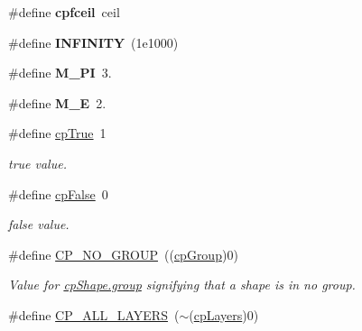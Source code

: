 \begin{DoxyCompactItemize}
\item 
\hypertarget{group__basic_types_gaccf0915062d413aede408e4ef872b61d}{\#define {\bfseries cpfceil}~ceil}\label{group__basic_types_gaccf0915062d413aede408e4ef872b61d}

\item 
\hypertarget{group__basic_types_ga956e2723d559858d08644ac99146e910}{\#define {\bfseries I\-N\-F\-I\-N\-I\-T\-Y}~(1e1000)}\label{group__basic_types_ga956e2723d559858d08644ac99146e910}

\item 
\hypertarget{group__basic_types_gae71449b1cc6e6250b91f539153a7a0d3}{\#define {\bfseries M\-\_\-\-P\-I}~3.}\label{group__basic_types_gae71449b1cc6e6250b91f539153a7a0d3}

\item 
\hypertarget{group__basic_types_ga9bf5d952c5c93c70f9e66c9794d406c9}{\#define {\bfseries M\-\_\-\-E}~2.}\label{group__basic_types_ga9bf5d952c5c93c70f9e66c9794d406c9}

\item 
\hypertarget{group__basic_types_gae30fc24a6e711797b9d39efa0e999987}{\#define \hyperlink{group__basic_types_gae30fc24a6e711797b9d39efa0e999987}{cp\-True}~1}\label{group__basic_types_gae30fc24a6e711797b9d39efa0e999987}

\begin{DoxyCompactList}\small\item\em true value. \end{DoxyCompactList}\item 
\hypertarget{group__basic_types_ga4b0cfe38ff97abec3400f9bb7e18f21e}{\#define \hyperlink{group__basic_types_ga4b0cfe38ff97abec3400f9bb7e18f21e}{cp\-False}~0}\label{group__basic_types_ga4b0cfe38ff97abec3400f9bb7e18f21e}

\begin{DoxyCompactList}\small\item\em false value. \end{DoxyCompactList}\item 
\hypertarget{group__basic_types_gabd2870d269e0288b26b045c81a07acc8}{\#define \hyperlink{group__basic_types_gabd2870d269e0288b26b045c81a07acc8}{C\-P\-\_\-\-N\-O\-\_\-\-G\-R\-O\-U\-P}~((\hyperlink{group__basic_types_gacd811b1135a8f4a3e5cc019552b18b1a}{cp\-Group})0)}\label{group__basic_types_gabd2870d269e0288b26b045c81a07acc8}

\begin{DoxyCompactList}\small\item\em Value for \hyperlink{structcp_shape_a2e6aaffa5f4107eda1718e4f69628fc1}{cp\-Shape.\-group} signifying that a shape is in no group. \end{DoxyCompactList}\item 
\hypertarget{group__basic_types_gac9fe85034881b2efb2621a156fa6126d}{\#define \hyperlink{group__basic_types_gac9fe85034881b2efb2621a156fa6126d}{C\-P\-\_\-\-A\-L\-L\-\_\-\-L\-A\-Y\-E\-R\-S}~($\sim$(\hyperlink{group__basic_types_ga5ec31e87ed3973cab80f9bfbbbcb43bb}{cp\-Layers})0)}\label{group__basic_types_gac9fe85034881b2efb2621a156fa6126d}


\end{DoxyCompactItemize}
